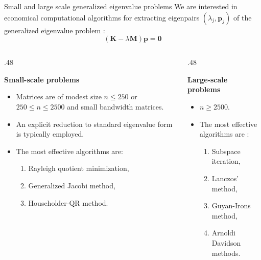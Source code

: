 \documentclass[aspectratio=169]{beamer}
\begin{document}
{  \begin{frame}{Small and large scale generalized eigenvalue problems}
    \small We are interested in economical computational algorithms for extracting eigenpairs $(\lambda_j,\mathbf p_j)$ of the generalized eigenvalue problem :
    $$(\mathbf K - \lambda \mathbf{M})\mathbf p=\mathbf 0$$
    \vspace{-0.8cm}
    \begin{columns}[T,onlytextwidth]
      \begin{column}{.48\textwidth}
        \begin{block}{}
          \textbf{\centering Small-scale problems}
          \begin{itemize}
            \item Matrices are of modest size $n\leq 250$ or $250\leq n \leq 2500$ and small bandwidth matrices.
            \item An explicit reduction to standard eigenvalue form is typically employed.
            \item The most effective algorithms are:
                  \begin{enumerate}
                    \item Rayleigh quotient minimization,
                    \item Generalized Jacobi method,
                    \item Householder-QR method.
                  \end{enumerate}
          \end{itemize}
        \end{block}
      \end{column}
      \begin{column}{.48\textwidth}
        \begin{block}{}
          \textbf{Large-scale problems}
          \begin{itemize}
            \item $n\geq 2500$.
            \item The most effective algorithms are :
                  \begin{enumerate}
                    \item Subspace iteration,
                    \item Lanczos' method,
                    \item Guyan-Irons method,
                    \item Arnoldi Davidson methods.
                  \end{enumerate}
          \end{itemize}
        \end{block}
      \end{column}
    \end{columns}
  \end{frame}

}
\end{document}
